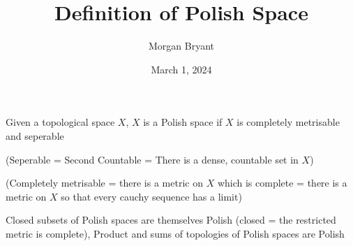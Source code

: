 \documentclass[a4paper]{article}
\title{Definition of Polish Space}
\date{March 1, 2024}
\author{Morgan Bryant}
\begin{document}
\maketitle
\par{Given a topological space \(X\), \(X\) is a Polish space if \(X\) is completely metrisable and seperable}\par{(Seperable = Second Countable = There is a dense, countable set in \(X\))}\par{(Completely metrisable = there is a metric on \(X\) which is complete = there is a metric on \(X\) so that every cauchy sequence 
has a limit)}\par{Closed subsets of Polish spaces are themselves Polish (closed = the restricted metric is complete), Product and sums of topologies of Polish spaces are Polish}
\printbibliography
\end{document}
